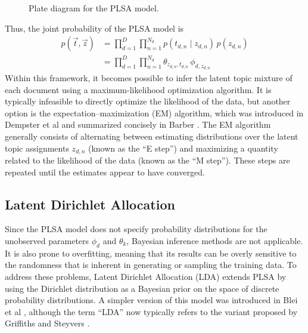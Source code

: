 \documentclass{article}
\begin{document}
\begin{figure}[htb]
%
\centering
{}
%
\caption{Plate diagram for the PLSA model.}
\label{fig:plate-plsa}
\end{figure}

Thus, the joint probability of the PLSA model is
\begin{align}
p(\vec{t}, \vec{z})
&= \prod_{d=1}^D \prod_{n=1}^{N_d} p(t_{d,n} \mid z_{d,n}) \, p(z_{d,n}) \\
&= \prod_{d=1}^D \prod_{n=1}^{N_d} \theta_{z_{d,n}, t_{d,n}} \, \phi_{d, z_{d,n}}
\end{align}
Within this framework, it becomes possible to infer the latent topic mixture of each document using a maximum-likelihood optimization algorithm.
It is typically infeasible to directly optimize the likelihood of the data, but another option is the expectation--maximization (EM) algorithm, which was introduced in Dempster et al \cite{dempster1977em} and summarized concisely in Barber \cite{barber2012bayesian}.
The EM algorithm generally consists of alternating between estimating distributions over the latent topic assignments $z_{d,n}$ (known as the ``E step'') and maximizing a quantity related to the likelihood of the data (known as the ``M step'').
These steps are repeated until the estimates appear to have converged.

\subsection{Latent Dirichlet Allocation}

Since the PLSA model does not specify probability distributions for the unobserved parameters $\phi_d$ and $\theta_k$, Bayesian inference methods are not applicable.
It is also prone to overfitting, meaning that its results can be overly sensitive to the randomness that is inherent in generating or sampling the training data.
To address these problems, Latent Dirichlet Allocation (LDA) extends PLSA by using the Dirichlet distribution as a Bayesian prior on the space of discrete probability distributions.
A simpler version of this model was introduced in Blei et al \cite{blei2003lda}, although the term ``LDA'' now typically refers to the variant proposed by Griffiths and Steyvers \cite{griffiths2004lda}.
\end{document}
